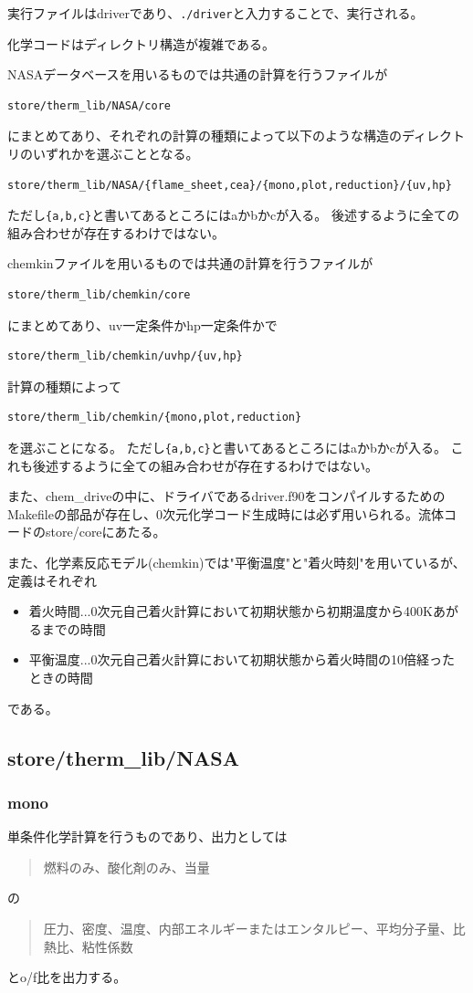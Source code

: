 \documentclass{jsarticle}
\begin{document}
実行ファイルはdriverであり、\verb|./driver|と入力することで、実行される。
\hspace{1em}

化学コードはディレクトリ構造が複雑である。

NASAデータベースを用いるものでは共通の計算を行うファイルが
\begin{verbatim}
store/therm_lib/NASA/core
\end{verbatim}
にまとめてあり、それぞれの計算の種類によって以下のような構造のディレクトリのいずれかを選ぶこととなる。
\begin{verbatim}
store/therm_lib/NASA/{flame_sheet,cea}/{mono,plot,reduction}/{uv,hp}
\end{verbatim}
ただし\verb|{a,b,c}|と書いてあるところにはaかbかcが入る。
後述するように全ての組み合わせが存在するわけではない。

chemkinファイルを用いるものでは共通の計算を行うファイルが
\begin{verbatim}
store/therm_lib/chemkin/core
\end{verbatim}
にまとめてあり、uv一定条件かhp一定条件かで
\begin{verbatim}
store/therm_lib/chemkin/uvhp/{uv,hp}
\end{verbatim}
計算の種類によって
\begin{verbatim}
store/therm_lib/chemkin/{mono,plot,reduction}
\end{verbatim}
を選ぶことになる。
ただし\verb|{a,b,c}|と書いてあるところにはaかbかcが入る。
これも後述するように全ての組み合わせが存在するわけではない。

また、chem\_driveの中に、ドライバであるdriver.f90をコンパイルするためのMakefileの部品が存在し、0次元化学コード生成時には必ず用いられる。流体コードのstore/coreにあたる。


また、化学素反応モデル(chemkin)では"平衡温度"と"着火時刻"を用いているが、定義はそれぞれ
\begin{itemize}
\item 着火時間...0次元自己着火計算において初期状態から初期温度から400Kあがるまでの時間
\item 平衡温度...0次元自己着火計算において初期状態から着火時間の10倍経ったときの時間
\end{itemize}
である。
\subsection{store/therm\_lib/NASA}%
\subsubsection{mono}%
単条件化学計算を行うものであり、出力としては
\begin{quotation}
燃料のみ、酸化剤のみ、当量
\end{quotation}
の
\begin{quotation}
圧力、密度、温度、内部エネルギーまたはエンタルピー、平均分子量、比熱比、粘性係数
\end{quotation}
とo/f比を出力する。
\end{document}
